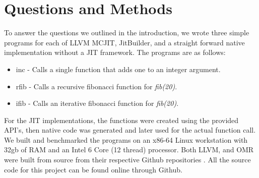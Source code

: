 \section{Questions and Methods}
\label{sec:methodology}
To answer the questions we outlined in the introduction, we wrote three simple programs for each of LLVM MCJIT, JitBuilder, and a straight forward native implementation without a JIT framework.
The programs are as follows:
\begin{itemize}
    \item inc - Calls a single function that adds one to an integer argument.
    \item rfib - Calls a recursive fibonacci function for \textit{fib(20)}.
    \item ifib - Calls an iterative fibonacci function for \textit{fib(20)}.  
\end{itemize}
For the JIT implementations, the functions were created using the provided API's, then native code was generated and later used for the actual function call.
We built and benchmarked the programs on an x86-64 Linux workstation with 32gb of RAM and an Intel 6 Core (12 thread) processor. 
Both LLVM, and OMR were built from source from their respective Github repositories \cite{llvmCommit, omrCommit}.
All the source code for this project can be found online through Github\cite{projectGithub}.
